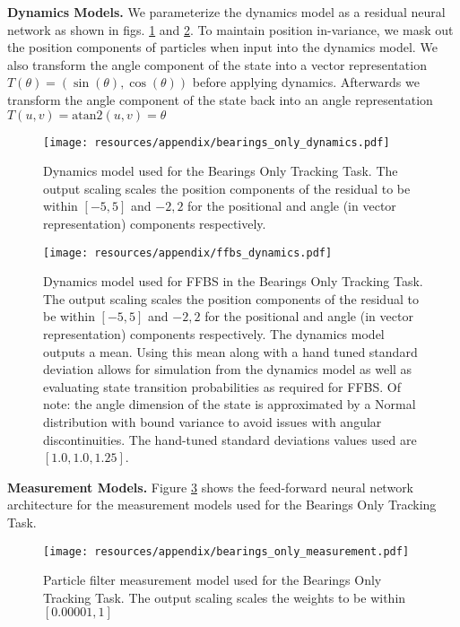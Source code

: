         
        \textbf{Dynamics Models.} We parameterize the dynamics model as a residual neural network as shown in figs. \ref{appx_fig:bearings_only_dynamics} and \ref{appx_fig:bearings_only_dynamics_ffbs}.  To maintain position in-variance, we mask out the position components of particles when input into the dynamics model. We also transform the angle component of the state into a vector representation $T(\theta) = (\sin(\theta), \cos(\theta))$ before applying dynamics.  Afterwards we transform the angle component of the state back into an angle representation $T(u, v) = \text{atan2}(u, v) = \theta$

        \begin{figure}[ht]
            \centering
            \texttt{[image: resources/appendix/bearings\_only\_dynamics.pdf]}
            \caption{\small{Dynamics model used for the Bearings Only Tracking Task. The output scaling scales the position components of the residual to be within $[-5, 5]$ and $-2, 2$ for the positional and angle (in vector representation) components respectively.}}
            \label{appx_fig:bearings_only_dynamics}
        \end{figure}

        \begin{figure}[ht]
            \centering
            \texttt{[image: resources/appendix/ffbs\_dynamics.pdf]}
            \caption{\small{Dynamics model used for FFBS in the Bearings Only Tracking Task. The output scaling scales the position components of the residual to be within $[-5, 5]$ and $-2, 2$ for the positional and angle (in vector representation) components respectively. The dynamics model outputs a mean. Using this mean along with a hand tuned standard deviation allows for simulation from the dynamics model as well as evaluating state transition probabilities as required for FFBS. Of note: the angle dimension of the state is approximated by a Normal distribution with bound variance to avoid issues with angular discontinuities.  The hand-tuned standard deviations values used are $[1.0, 1.0, 1.25]$.}}
            \label{appx_fig:bearings_only_dynamics_ffbs}
        \end{figure}


        \textbf{Measurement Models.} Figure \ref{appx_fig:bearings_only_measurement} shows the feed-forward neural network architecture for the measurement models used for the Bearings Only Tracking Task.

        
        \begin{figure}[ht]
            \centering
            \texttt{[image: resources/appendix/bearings\_only\_measurement.pdf]}
            \caption{\small{Particle filter measurement model used for the Bearings Only Tracking Task. The output scaling scales the weights to be within $[0.00001, 1]$}}
            \label{appx_fig:bearings_only_measurement}
        \end{figure}


